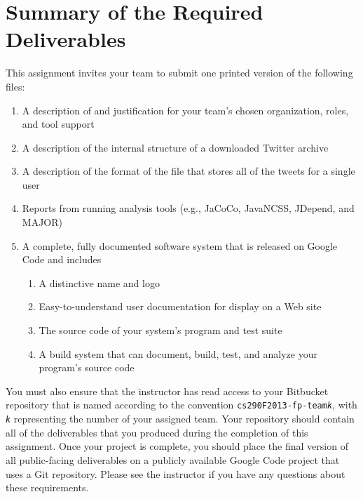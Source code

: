 \section*{Summary of the Required Deliverables}

This assignment invites your team to submit one printed version of the following files:
\vspace*{-.1in}
\begin{enumerate}
	\itemsep0em 
	\item A description of and justification for your team's chosen organization, roles, and tool support
	\item A description of the internal structure of a downloaded Twitter archive
	\item A description of the format of the file that stores all of the tweets for a single user
	\item Reports from running analysis tools (e.g., JaCoCo, JavaNCSS, JDepend, and MAJOR) 
	\item A complete, fully documented software system that is released on Google Code and includes
	\begin{enumerate}
		\item A distinctive name and logo
		\item Easy-to-understand user documentation for display on a Web site
		\item The source code of your system's program and test suite
		\item A build system that can document, build, test, and analyze your program's source code
	\end{enumerate}

\end{enumerate}
\vspace*{-.1in}

You must also ensure that the instructor has read access to your Bitbucket repository that is named according to the
convention {\tt cs290F2013-fp-team{\em k}}, with {\tt {\em k}} representing the number of your assigned team.  Your
repository should contain all of the deliverables that you produced during the completion of this assignment.  Once your
project is complete, you should place the final version of all public-facing deliverables on a publicly available Google
Code project that uses a Git repository. Please see the instructor if you have any questions about these requirements.



